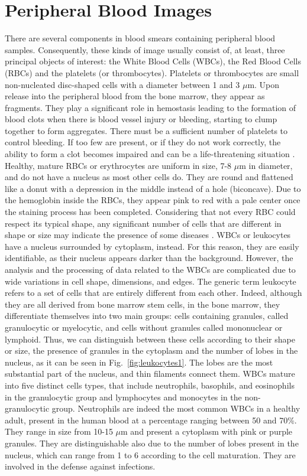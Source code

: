 \documentclass[final,a4paper,12pt,english]{UnicaPhdThesis3}
\begin{document}
\section{Peripheral Blood Images}
There are several components in blood smears containing peripheral blood samples. Consequently, these kinds of image usually consist of, at least, three principal objects of interest: the White Blood Cells (\acs{WBC}s), the Red Blood Cells (\acs{RBC}s) and the platelets (or thrombocytes). 
Platelets or thrombocytes are small non-nucleated disc-shaped cells with a diameter between 1 and 3 $\mu$m. Upon release into the peripheral blood from the bone marrow, they appear as fragments. They play a significant role in hemostasis leading to the formation of blood clots when there is blood vessel injury or bleeding, starting to clump together to form aggregates. There must be a sufficient number of platelets to control bleeding. If too few are present, or if they do not work correctly, the ability to form a clot becomes impaired and can be a life-threatening situation \cite{Ciesla}. Healthy, mature RBCs or erythrocytes are uniform in size, 7-8 $\mu$m in diameter,  and do not have a nucleus as most other cells do. They are round and flattened like a donut with a depression in the middle instead of a hole (biconcave). Due to the hemoglobin inside the RBCs, they appear pink to red with a pale center once the staining process has been completed. Considering that not every RBC could respect its typical shape, any significant number of cells that are different in shape or size may indicate the presence of some diseases \cite{Erhabor}. WBCs or leukocytes have a nucleus surrounded by cytoplasm, instead. For this reason, they are easily identifiable, as their nucleus appears darker than the background. However, the analysis and the processing of data related to the WBCs are complicated due to wide variations in cell shape, dimensions, and edges. The generic term leukocyte refers to a set of cells that are entirely different from each other. Indeed, although they are all derived from bone marrow stem cells, in the bone marrow, they differentiate themselves into two main groups: cells containing granules, called granulocytic or myelocytic, and cells without granules called mononuclear or lymphoid. Thus, we can distinguish between these cells according to their shape or size, the presence of granules in the cytoplasm and the number of lobes in the nucleus, as it can be seen in Fig.~\ref{fig:leukocytes1}. The lobes are the most substantial part of the nucleus, and thin filaments connect them. WBCs mature into five distinct cells types, that include neutrophils, basophils, and eosinophils in the granulocytic group and lymphocytes and monocytes in the non-granulocytic group. Neutrophils are indeed the most common WBCs in a healthy adult, present in the human blood at a percentage ranging between 50 and 70\%. They range in size from 10-15 $\mu$m and present a cytoplasm with pink or purple granules. They are distinguishable also due to the number of lobes present in the nucleus, which can range from 1 to 6 according to the cell maturation. They are involved in the defense against infections.
\end{document}
